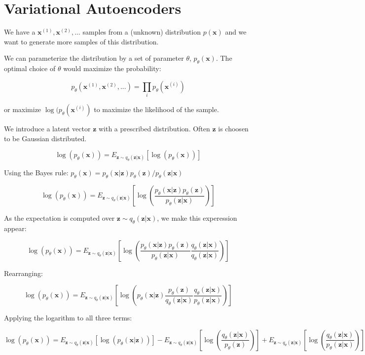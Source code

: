 \documentclass[12pt, a4paper]{article}
\begin{document}
\section{Variational Autoencoders}

\renewcommand{\vec}{\mathbf}

We have a $\vec x^{(1)}, \vec x^{(2)}, ...$ samples from a (unknown) distribution $p(\vec x)$ and we want to generate more samples of this distribution.

We can parameterize the distribution by a set of parameter $\theta$, $p_\theta(\vec x)$. The optimal choice of $\theta$ would maximize the probability:

$$
p_\theta(\vec x^{(1)}, \vec x^{(2)}, ...)  =  \prod_i  p_\theta( \vec x^{(i)})
$$

or maximize $\log( p_\theta( \vec x^{(i)})$ to maximize the likelihood of the sample.


We introduce a latent vector $\vec z$ with a prescribed distribution. Often $\vec z$ is choosen to be Gaussian distributed.


\newcommand{\Eq}{E_{\vec z \sim q_\theta(\vec z | \vec x)}}

$$
\log( p_\theta( \vec x) ) = \Eq[ \log( p_\theta(\vec x))  ]
$$

Using the Bayes rule: $ p_\theta(\vec x) = p_\theta(\vec x | \vec z) p_\theta(\vec z) / p_\theta(\vec z | \vec x)$

$$
 \log( p_\theta(\vec x))  = 
\Eq\left[
\log\left(
\frac{ p_\theta(\vec x | \vec z) p_\theta(\vec z) } { p_\theta(\vec z | \vec x)}
\right)
\right]
$$

As the expectation is computed over $\vec z \sim q_\theta(\vec z | \vec x)$, we make this experession appear:


$$
\log( p_\theta(\vec x))  = 
\Eq\left[
\log\left(
\frac{ p_\theta(\vec x | \vec z) p_\theta(\vec z) } { p_\theta(\vec z | \vec x)}
\frac{ q_\theta(\vec z | \vec x) } { q_\theta(\vec z | \vec x)}
\right)
\right]
$$


Rearranging:

$$
\log( p_\theta(\vec x))  = 
\Eq\left[
  \log\left(
  p_\theta(\vec x | \vec z)
\frac{ p_\theta(\vec z) } { q_\theta(\vec z | \vec x)}
\frac{ q_\theta(\vec z | \vec x) } { p_\theta(\vec z | \vec x) }
\right)
\right]
$$

Applying the logarithm to all three terms:

$$
\log( p_\theta(\vec x))  = 
\Eq\left[\log\left( p_\theta(\vec x | \vec z) \right) \right]
- \Eq\left[\log\left( \frac{ q_\theta(\vec z | \vec x) }{p_\theta(\vec z) } \right) \right]
+ \Eq\left[\log\left( \frac{ q_\theta(\vec z | \vec x) }{p_\theta(\vec z | \vec x)} \right) \right]
$$
\end{document}
